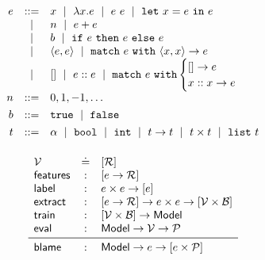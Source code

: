 \begin{figure}
\centering
\begin{minipage}[c]{.4\textwidth}
$$
\begin{array}{rcl}
e & ::=    & x \spmid \efun{x}{e} \spmid \eapp{e}{e} \spmid \elet{x}{e}{e} \\
  & \spmid & n \spmid \eplus{e}{e}\\
  & \spmid & b \spmid \eif{e}{e}{e} \\
  & \spmid & \epair{e}{e} \spmid \epcase{e}{x}{x}{e} \\
  & \spmid & \enil \spmid \econs{e}{e} \spmid \ecase{e}{e}{x}{x}{e} \\[0.05in]

n & ::= &  0, 1, -1, \ldots \\[0.05in]

b & ::= &  \etrue \spmid \efalse \\[0.05in]

t & ::= & \alpha \spmid \tbool \spmid \tint \spmid \tfun{t}{t} \spmid \tprod{t}{t} \spmid \tlist{t} \\[0.05in]
\end{array}
$$
\label{fig:syntax}
\end{minipage}
\hfill
\begin{minipage}[c]{.45\textwidth}
$$
\begin{array}{lcl}
  \V          & \defeq & \List{\R}\\

  \featuresym & : & \List{e \to \R} \\
  \labelsym   & : & e \times e \to \List{e} \\
  \extractsym & : & \List{e \to \R} \to e \times e \to \List{\V \times \B} \\
  \trainsym   & : & \List{\V \times \B} \to \Model \\
  \evalsym    & : & \Model \to \V \to \Runit \\
  \midrule
  \blamesym   & : & \Model \to e \to \List{e \times \Runit}
\end{array}
$$
\label{fig:api}
\end{minipage}
\end{figure}

